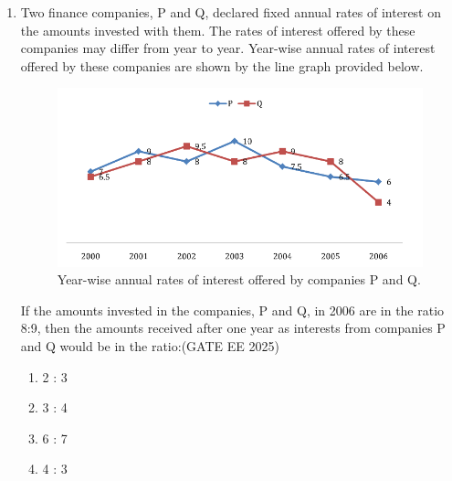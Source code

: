 \begin{enumerate}[leftmargin=0pt,label=\textbf{Q.\arabic*}, resume]

\item Two finance companies, P and Q, declared fixed annual rates of interest on the amounts invested with them. The rates of interest offered by these companies may differ from year to year. Year-wise annual rates of interest offered by these companies are shown by the line graph provided below.


\begin{figure}
    \centering
    \includegraphics[width=0.9\columnwidth]{figs/imageQ6.png}
    \caption{Year-wise annual rates of interest offered by companies P and Q.}
    \label{fig:q6-rates}
\end{figure}

\newpage
If the amounts invested in the companies, P and Q, in 2006 are in the ratio 8:9, then the amounts received after one year as interests from companies P and Q would be in the ratio:\hfill {(GATE EE 2025)}

\begin{multicols}{2}
\begin{enumerate}
\item 2 : 3
\item 3 : 4
\item 6 : 7
\item 4 : 3
\end{enumerate}
\end{multicols}


\end{enumerate}

